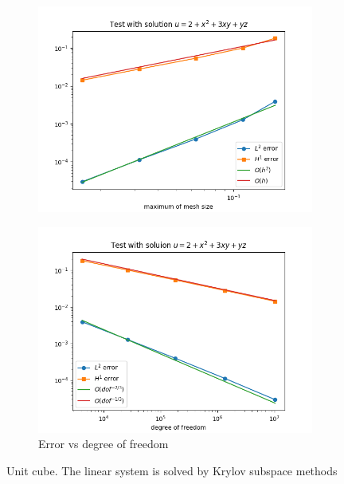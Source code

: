 \documentclass[12pt]{article}%
\theoremstyle{plain}
\numberwithin{equation}{section}
\begin{document}
\begin{figure}[H]
\begin{subfigure}[h]{0.45\linewidth}
\includegraphics[width=\linewidth]{figures/Ex2/Ex2_test_2.png}
\end{subfigure}
    \begin{subfigure}[h]{0.45\linewidth}
     \caption{Error vs degree of freedom}
\includegraphics[width=\linewidth]{figures/Ex2/Ex2_test_2_dof.png}
\end{subfigure}
  \caption{Unit cube. The linear system is solved by Krylov subspace methods }
  \label{fig:Ex2_test_2}
 \end{figure}
\end{document}
